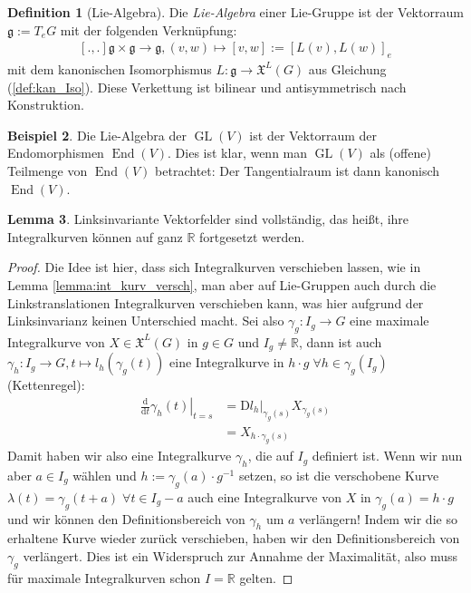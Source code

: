 \documentclass[a4paper]{scrbook}
\numberwithin{equation}{chapter}
\newcommand{\D}{\mathrm{d}}
\newcommand{\DD}{\mathrm{D}}
\DeclareMathOperator{\GL}{GL}
\DeclareMathOperator{\End}{End}
\newcommand{\R}{\mathbb{R}}
\newcommand{\vf}{\mathfrak{X}}
\theoremstyle{definition}
\newtheorem{defn}{Definition}[section]
\newtheorem{lemma}[defn]{Lemma}
\newtheorem{bsp}[defn]{Beispiel}
\begin{document}
		\begin{defn}[Lie-Algebra]
			Die \emph{Lie-Algebra} einer Lie-Gruppe ist der Vektorraum $\mathfrak{g}:=T_eG$ mit der folgenden Verknüpfung:
			\begin{align*}
				\left[.,.\right]\mathfrak{g}\times \mathfrak{g}\rightarrow \mathfrak{g}, (v,w)\mapsto \left[v,w\right]:=\left[L(v),L(w)\right]_e
			\end{align*}
			mit dem kanonischen Isomorphismus $L\colon \mathfrak{g}\to \vf^L(G)$ aus Gleichung (\ref{def:kan_Iso}). Diese Verkettung ist bilinear und antisymmetrisch nach Konstruktion.
		\end{defn}
		\begin{bsp}\hfill
			Die Lie-Algebra der $\GL(V)$ ist der Vektorraum der Endomorphismen $\End(V)$. Dies ist klar, wenn man $\GL(V)$ als (offene) Teilmenge von $\End(V)$ betrachtet: Der Tangentialraum ist dann kanonisch $\End(V)$.
		\end{bsp}
		\begin{lemma}
			Linksinvariante Vektorfelder sind vollständig, das heißt, ihre Integralkurven können auf ganz $\R$ fortgesetzt werden.
			\begin{proof}
			Die Idee ist hier, dass sich Integralkurven verschieben lassen, wie in Lemma \ref{lemma:int_kurv_versch}, man aber auf Lie-Gruppen auch durch die Linkstranslationen Integralkurven verschieben kann, was hier aufgrund der Linksinvarianz keinen Unterschied macht. Sei also $\gamma_g\colon I_g\rightarrow G$ eine maximale Integralkurve von $X\in\vf^L(G)$ in $g\in G$ und $I_g\neq \R$, dann ist auch $\gamma_h\colon I_g\rightarrow G, t\mapsto l_h(\gamma_g(t))$ eine Integralkurve in $h\cdot g\;\forall h\in\gamma_g(I_g)$ (Kettenregel):
			\begin{align*}
				\left.\frac{\D}{\D t}\gamma_h(t)\right\vert_{t=s}&=\DD l_h\vert_{\gamma_g(s)} X_{\gamma_g(s)}\\
				&=X_{h\cdot \gamma_g(s)}
			\end{align*}
			Damit haben wir also eine Integralkurve $\gamma_h$, die auf $I_g$ definiert ist. Wenn wir nun aber $a \in I_g$ wählen und $h := \gamma_g(a) \cdot g^{-1}$ setzen, so ist die verschobene Kurve $\lambda(t)=\gamma_g(t+a)\;\forall t\in I_g-a$ auch eine Integralkurve von $X$ in $\gamma_g(a) = h \cdot g$ und wir können den Definitionsbereich von $\gamma_h$ um $a$ verlängern! Indem wir die so erhaltene Kurve wieder zurück verschieben, haben wir den Definitionsbereich von $\gamma_g$ verlängert. Dies ist ein Widerspruch zur Annahme der Maximalität, also muss für maximale Integralkurven schon $I=\R$ gelten.
			\end{proof}
		\end{lemma}
\end{document}
